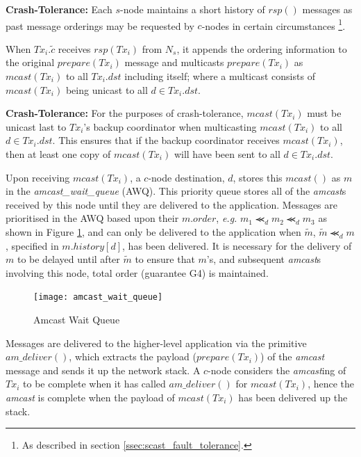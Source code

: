 \begin{enumerate}
        \textbf{Crash-Tolerance:} Each $s$-node maintains a short history of $rsp()$ messages as past message orderings may be requested by $c$-nodes in certain circumstances \footnote{As described in section \ref{ssec:scast_fault_tolerance}.}.          
        
        \leftbar
        When $Tx_i.\tilde{c}$ receives $rsp(Tx_i)$ from $N_s$, it appends the ordering information to the original $prepare(Tx_i)$ message and multicasts $prepare(Tx_i)$ as $mcast(Tx_i)$ to all $Tx_i.dst$ including itself; where a multicast consists of $mcast(Tx_i)$ being unicast to all $d \in Tx_i.dst$. 
        
        \textbf{Crash-Tolerance:} For the purposes of crash-tolerance, $mcast(Tx_i)$ must be unicast last to $Tx_i$'s backup coordinator when multicasting $mcast(Tx_i)$ to all $d \in Tx_i.dst$.  This ensures that if the backup coordinator receives $mcast(Tx_i)$, then at least one copy of $mcast(Tx_i)$ will have been sent to all $d \in Tx_i.dst$.  
        \endleftbar
        
        \leftbar
        Upon receiving $mcast(Tx_i)$, a $c$-node destination, $d$, stores this $mcast()$ as $m$ in the \emph{amcast\_wait\_queue} (AWQ).  This priority queue stores all of the \emph{amcast}s received by this node until they are delivered to the application.  Messages are prioritised in the AWQ based upon their $m.order$, \emph{e.g.} $m_1 \llcurly_d m_2 \llcurly_d m_3$ as shown in Figure \ref{fig:awq}, and can only be delivered to the application when $\tilde{m}$, $\tilde{m} \llcurly_d m$, specified in $m.history[d]$, has been delivered.  It is necessary for the delivery of $m$ to be delayed until after $\tilde{m}$ to ensure that $m$'s, and subsequent \emph{amcast}s involving this node, total order (guarantee G4) is maintained.  
        
         \begin{figure}[H] 
        \centering    
         \texttt{[image: amcast\_wait\_queue]}
         \caption[Amcast Wait Queue]{Amcast Wait Queue}
         \label{fig:awq}
    \end{figure}             
        \vspace{-2em}
        Messages are delivered to the higher-level application via the primitive $am\_deliver()$, which extracts the payload ($prepare(Tx_i)$) of the \emph{amcast} message and sends it up the network stack.  A $c$-node considers the \emph{amcast}ing of $Tx_i$ to be complete when it has called $am\_deliver()$ for $mcast(Tx_i)$, hence the \emph{amcast} is complete when the payload of $mcast(Tx_i)$ has been delivered up the stack.  
        

\end{enumerate}
